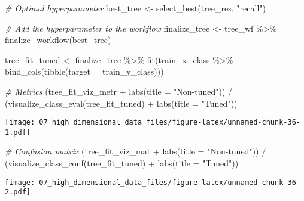 \documentclass[
]{book}
\newenvironment{Shaded}{\begin{snugshade}}{\end{snugshade}}
\newcommand{\AttributeTok}[1]{\textcolor[rgb]{0.77,0.63,0.00}{#1}}
\newcommand{\CommentTok}[1]{\textcolor[rgb]{0.56,0.35,0.01}{\textit{#1}}}
\newcommand{\FunctionTok}[1]{\textcolor[rgb]{0.00,0.00,0.00}{#1}}
\newcommand{\NormalTok}[1]{#1}
\newcommand{\OtherTok}[1]{\textcolor[rgb]{0.56,0.35,0.01}{#1}}
\newcommand{\SpecialCharTok}[1]{\textcolor[rgb]{0.00,0.00,0.00}{#1}}
\newcommand{\StringTok}[1]{\textcolor[rgb]{0.31,0.60,0.02}{#1}}
\begin{document}
\begin{Shaded}
\begin{Highlighting}[]
\CommentTok{\# Optimal hyperparameter}
\NormalTok{best\_tree }\OtherTok{\textless{}{-}} \FunctionTok{select\_best}\NormalTok{(tree\_res, }\StringTok{"recall"}\NormalTok{)}

\CommentTok{\# Add the hyperparameter to the workflow}
\NormalTok{finalize\_tree }\OtherTok{\textless{}{-}}\NormalTok{ tree\_wf }\SpecialCharTok{\%\textgreater{}\%}
  \FunctionTok{finalize\_workflow}\NormalTok{(best\_tree)}
\end{Highlighting}
\end{Shaded}

\begin{Shaded}
\begin{Highlighting}[]
\NormalTok{tree\_fit\_tuned }\OtherTok{\textless{}{-}}\NormalTok{ finalize\_tree }\SpecialCharTok{\%\textgreater{}\%}
  \FunctionTok{fit}\NormalTok{(train\_x\_class }\SpecialCharTok{\%\textgreater{}\%} \FunctionTok{bind\_cols}\NormalTok{(}\FunctionTok{tibble}\NormalTok{(}\AttributeTok{target =}\NormalTok{ train\_y\_class)))}

\CommentTok{\# Metrics}
\NormalTok{(tree\_fit\_viz\_metr }\SpecialCharTok{+} \FunctionTok{labs}\NormalTok{(}\AttributeTok{title =} \StringTok{"Non{-}tuned"}\NormalTok{)) }\SpecialCharTok{/}\NormalTok{ (}\FunctionTok{visualize\_class\_eval}\NormalTok{(tree\_fit\_tuned) }\SpecialCharTok{+} \FunctionTok{labs}\NormalTok{(}\AttributeTok{title =} \StringTok{"Tuned"}\NormalTok{))}
\end{Highlighting}
\end{Shaded}

\texttt{[image: 07\_high\_dimensional\_data\_files/figure-latex/unnamed-chunk-36-1.pdf]}

\begin{Shaded}
\begin{Highlighting}[]
\CommentTok{\# Confusion matrix}
\NormalTok{(tree\_fit\_viz\_mat }\SpecialCharTok{+} \FunctionTok{labs}\NormalTok{(}\AttributeTok{title =} \StringTok{"Non{-}tuned"}\NormalTok{)) }\SpecialCharTok{/}\NormalTok{ (}\FunctionTok{visualize\_class\_conf}\NormalTok{(tree\_fit\_tuned) }\SpecialCharTok{+} \FunctionTok{labs}\NormalTok{(}\AttributeTok{title =} \StringTok{"Tuned"}\NormalTok{))}
\end{Highlighting}
\end{Shaded}

\texttt{[image: 07\_high\_dimensional\_data\_files/figure-latex/unnamed-chunk-36-2.pdf]}
\end{document}
